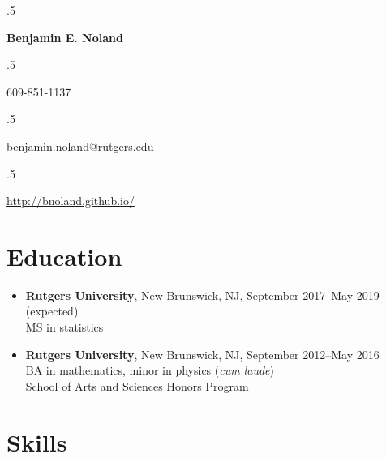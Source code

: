 \documentclass[letterpaper,12pt]{article}
\begin{document}
\moveleft.5\hoffset\centerline{\Large\bf Benjamin E. Noland}
\smallskip
\moveleft.5\hoffset\centerline{609-851-1137}
\moveleft.5\hoffset\centerline{benjamin.noland@rutgers.edu}
\moveleft.5\hoffset\centerline{\url{http://bnoland.github.io/}}

\section*{Education}

\begin{itemize}
\item
\textbf{Rutgers University}, New Brunswick, NJ, September 2017--May 2019 (expected) \\
MS in statistics

\item
\textbf{Rutgers University}, New Brunswick, NJ, September 2012--May 2016 \\
BA in mathematics, minor in physics (\textit{cum laude}) \\
School of Arts and Sciences Honors Program
\end{itemize}
\iffalse
\subsection*{Selection of coursework:}
\begin{itemize}
\item
\textbf{Mathematics:} Calculus, linear algebra, ordinary differential equations, real analysis, 
complex variables, differential geometry, linear programming, abstract algebra, topology 
\textit{(taken at Rutgers University)}

\item
\textbf{Physics:}
Classical mechanics, electromagnetism, astrophysics \textit{(taken at Rutgers University)}

\item
\textbf{Computer science:}
Systems programming, data structures and algorithms \textit{(taken at Princeton University while in 
high school)}; Advanced Placement computer science \textit{(taken in high school)}

\item
\textbf{Statistics:} Advanced Placement statistics \textit{(taken in high school)}, probability 
theory, regression analysis \textit{(taking at Rutgers University)}

\end{itemize}
\fi
\section*{Skills}
\end{document}
